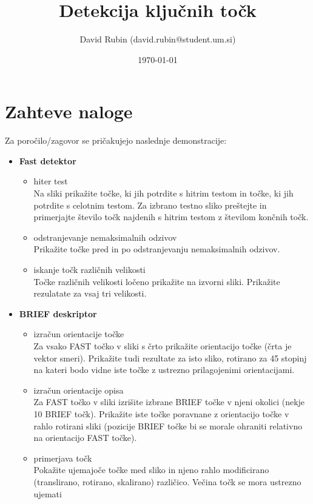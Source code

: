 \documentclass[a4paper,11pt]{article}
\title{Detekcija ključnih točk}
\author{David Rubin (david.rubin@student.um.si)}
\date{\today}
\begin{document}
\maketitle

\section{Zahteve naloge}

Za poročilo/zagovor se pričakujejo naslednje demonstracije:
\begin{itemize}
    \item \textbf{Fast detektor}
        \begin{itemize}
        	\item hiter test \\
            Na sliki prikažite točke, ki jih potrdite s hitrim testom in točke, ki jih potrdite s celotnim testom. Za izbrano testno sliko preštejte in primerjajte število točk najdenih s hitrim testom z številom končnih točk.
        \item odstranjevanje nemaksimalnih odzivov \\
            Prikažite točke pred in po odstranjevanju nemaksimalnih odzivov.
        \item iskanje točk različnih velikosti \\
            Točke različnih velikosti ločeno prikažite na izvorni sliki. Prikažite rezulatate za vsaj tri velikosti.

          \end{itemize}
            \item \textbf{BRIEF deskriptor}
            \begin{itemize}
            
        \item izračun orientacije točke \\
            Za vsako FAST točko v sliki s črto prikažite orientacijo točke (črta je vektor smeri). Prikažite tudi rezultate za isto sliko, rotirano za 45 stopinj na kateri bodo vidne iste točke z ustrezno prilagojenimi orientacijami.
        \item izračun orientacije opisa \\
            Za FAST točko v sliki izrišite izbrane BRIEF točke v njeni okolici (nekje 10 BRIEF točk). Prikažite iste točke poravnane z orientacijo točke v rahlo rotirani sliki (pozicije BRIEF točke bi se morale ohraniti relativno na orientacijo FAST točke).
        \item primerjava točk \\
            Pokažite ujemajoče točke med sliko in njeno rahlo modificirano (translirano, rotirano, skalirano) različico. Večina točk se mora ustrezno ujemati
            \end{itemize}
\end{itemize}
\end{document}
